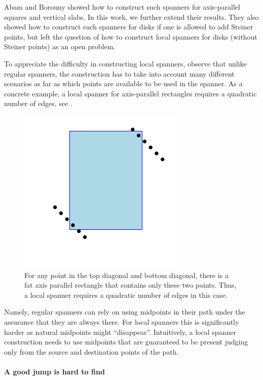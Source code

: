 Abam and Borouny \cite{ab-lgs-21} showed how to construct such
spanners for axis-parallel squares and vertical slabs. In this work,
we further extend their results.  They also showed how to construct
such spanners for disks if one is allowed to add Steiner points, but
left the question of how to construct local spanners for disks
(without Steiner points) as an open problem.

To appreciate the difficulty in constructing local spanners, observe
that unlike regular spanners, the construction has to take into
account many different scenarios as far as which points are available
to be used in the spanner. As a concrete example, a local spanner for
axis-parallel rectangles requires a quadratic number of edges, see
.

\begin{figure}[h]
    \centerline{\includegraphics{../figs/local_rectangles}}
    \caption{For any point in the top diagonal and bottom diagonal,
       there is a fat axis parallel rectangle that contains only these
       two points. Thus, a local spanner requires a quadratic number
       of edges in this case.  }
\end{figure}

Namely, regular spanners can rely on using midpoints in their path
under the assurance that they are always there. For local spanners
this is significantly harder as natural midpoints might
``disappear''. Intuitively, a local spanner construction needs to use
midpoints that are guaranteed to be present judging only from the
source and destination points of the path.

\paragraph*{A good jump is hard to find}

